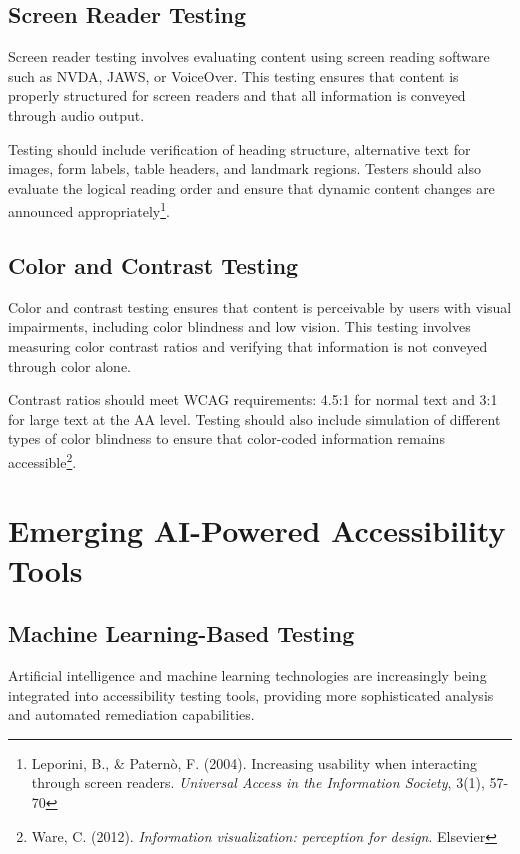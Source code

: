 \subsection{Screen Reader Testing}

Screen reader testing involves evaluating content using screen reading software such as NVDA, JAWS, or VoiceOver. This testing ensures that content is properly structured for screen readers and that all information is conveyed through audio output.

Testing should include verification of heading structure, alternative text for images, form labels, table headers, and landmark regions. Testers should also evaluate the logical reading order and ensure that dynamic content changes are announced appropriately\footnote{Leporini, B., \& Paternò, F. (2004). Increasing usability when interacting through screen readers. \textit{Universal Access in the Information Society}, 3(1), 57-70}.

\subsection{Color and Contrast Testing}

Color and contrast testing ensures that content is perceivable by users with visual impairments, including color blindness and low vision. This testing involves measuring color contrast ratios and verifying that information is not conveyed through color alone.

Contrast ratios should meet WCAG requirements: 4.5:1 for normal text and 3:1 for large text at the AA level. Testing should also include simulation of different types of color blindness to ensure that color-coded information remains accessible\footnote{Ware, C. (2012). \textit{Information visualization: perception for design}. Elsevier}.

\section{Emerging AI-Powered Accessibility Tools}

\subsection{Machine Learning-Based Testing}

Artificial intelligence and machine learning technologies are increasingly being integrated into accessibility testing tools, providing more sophisticated analysis and automated remediation capabilities.

